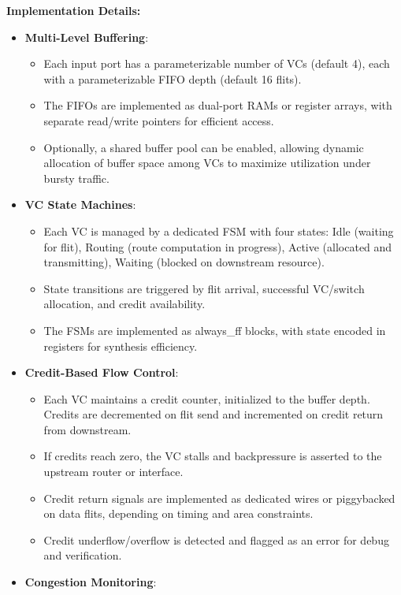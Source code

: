 \documentclass[11pt,a4paper]{article}
\begin{document}
\textbf{Implementation Details:}
\begin{itemize}
    \item \textbf{Multi-Level Buffering}:
    \begin{itemize}
        \item Each input port has a parameterizable number of VCs (default 4), each with a parameterizable FIFO depth (default 16 flits).
        \item The FIFOs are implemented as dual-port RAMs or register arrays, with separate read/write pointers for efficient access.
        \item Optionally, a shared buffer pool can be enabled, allowing dynamic allocation of buffer space among VCs to maximize utilization under bursty traffic.
    \end{itemize}
    \item \textbf{VC State Machines}:
    \begin{itemize}
        \item Each VC is managed by a dedicated FSM with four states: Idle (waiting for flit), Routing (route computation in progress), Active (allocated and transmitting), Waiting (blocked on downstream resource).
        \item State transitions are triggered by flit arrival, successful VC/switch allocation, and credit availability.
        \item The FSMs are implemented as always\_ff blocks, with state encoded in registers for synthesis efficiency.
    \end{itemize}
    \item \textbf{Credit-Based Flow Control}:
    \begin{itemize}
        \item Each VC maintains a credit counter, initialized to the buffer depth. Credits are decremented on flit send and incremented on credit return from downstream.
        \item If credits reach zero, the VC stalls and backpressure is asserted to the upstream router or interface.
        \item Credit return signals are implemented as dedicated wires or piggybacked on data flits, depending on timing and area constraints.
        \item Credit underflow/overflow is detected and flagged as an error for debug and verification.
    \end{itemize}
    \item \textbf{Congestion Monitoring}:
    \begin{itemize}

\end{itemize}
\end{itemize}
\end{document}

